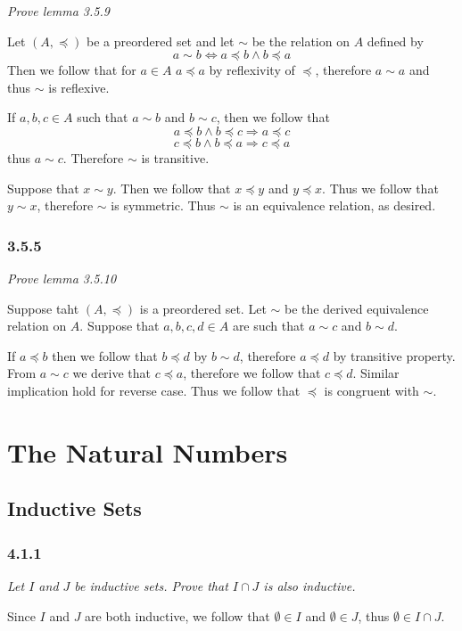 \documentclass[11pt,oneside,titlepage]{book}
\DeclareMathOperator \ra {\Rightarrow}
\begin{document}
\textit{Prove lemma 3.5.9}

Let $(A, \preceq)$ be a preordered set and let $\sim$ be the relation on $A$ defined by
$$a \sim b \iff a \preceq b \land b \preceq a$$
Then we follow that for $a \in A$ $a \preceq a$ by reflexivity of $\preceq$, therefore
$a \sim a$ and thus $\sim$ is reflexive.

If $a, b, c \in A$ such that $a \sim b$ and $b \sim c$, then we follow that
$$a \preceq b \land b \preceq c \ra a \preceq c$$
$$c \preceq b \land b \preceq a \ra c \preceq a$$
thus $a \sim c$. Therefore $\sim$ is transitive.

Suppose that $x \sim y$. Then we follow that $x \preceq y $ and $y \preceq x$. Thus we follow that
$y \sim x$, therefore $\sim$ is symmetric. Thus $\sim$ is an equivalence relation, as desired.

\subsection*{3.5.5}

\textit{Prove lemma 3.5.10}

Suppose taht $(A, \preceq)$ is a preordered set. Let $\sim$ be the derived equivalence
relation on $A$. Suppose that $a, b, c, d \in A$ are such that $a \sim c$ and $b \sim d$.

If $a \preceq b$ then we follow that $b \preceq d$ by $b \sim d$, therefore $a \preceq d$
by transitive property. From $a \sim c$ we derive that $c \preceq a$, therefore we
follow that $c \preceq d$. Similar implication hold for reverse case. Thus we follow that
$\preceq$ is congruent with $\sim$.


\chapter{The Natural Numbers}

\section{Inductive Sets}

\subsection*{4.1.1}

\textit{Let $I$ and $J$ be inductive sets. Prove that $I \cap J$ is also inductive.}

Since $I$ and $J$ are both inductive, we follow that $\emptyset \in I$ and $\emptyset \in J$,
thus $\emptyset \in I \cap J$.
\end{document}
